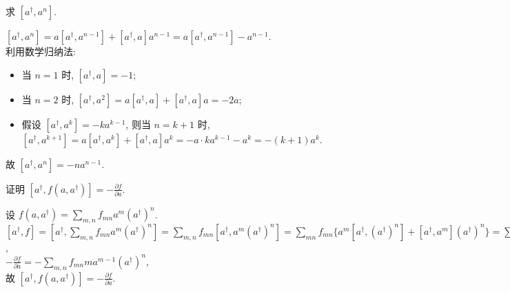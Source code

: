 \documentclass{assignment}
\begin{document}
\begin{prob}
    求 $[a^{\dagger},a^n]$.
\end{prob}
\begin{sol}
    $[a^{\dagger},a^n]=a[a^{\dagger},a^{n-1}]+[a^{\dagger},a]a^{n-1}=a[a^{\dagger},a^{n-1}]-a^{n-1}$.\\
    利用数学归纳法:
    \begin{itemize}
        \item 当 $n=1$ 时, $[a^{\dagger},a]=-1$;
        \item 当 $n=2$ 时, $[a^{\dagger},a^2]=a[a^{\dagger},a]+[a^{\dagger},a]a=-2a$;
        \item 假设 $[a^{\dagger},a^k]=-ka^{k-1}$, 则当 $n=k+1$ 时, $[a^{\dagger},a^{k+1}]=a[a^{\dagger},a^k]+[a^{\dagger},a]a^k=-a\cdot ka^{k-1}-a^k=-(k+1)a^k$.
    \end{itemize}
    故 $[a^{\dagger},a^n]=-na^{n-1}$.
\end{sol}

\begin{prob}
    证明 $[a^{\dagger},f(a,a^{\dagger})]=-\frac{\partial f}{\partial a}$.
\end{prob}
\begin{pf}
    设 $f(a,a^{\dagger})=\sum_{m,n}f_{mn}a^m(a^{\dagger})^n$.\\
    $[a^{\dagger},f]=[a^{\dagger},\sum_{m,n}f_{mn}a^m(a^{\dagger})^n]=\sum_{m,n}f_{mn}[a^{\dagger},a^m(a^{\dagger})^n]=\sum_{mn}f_{mn}\{a^m[a^{\dagger},(a^{\dagger})^n]+[a^{\dagger},a^m](a^{\dagger})^n\}=\sum_{m,n}f_{mn}[a^{\dagger},a^n](a^{\dagger})^n=-\sum_{m,n}f_{mn}ma^{m-1}(a^{\dagger})^n$,\\
    $-\frac{\partial f}{\partial a}=-\sum_{m,n}f_{mn}ma^{m-1}(a^{\dagger})^n$,\\
    故 $[a^{\dagger},f(a,a^{\dagger})]=-\frac{\partial f}{\partial a}$.
\end{pf}
\end{document}
